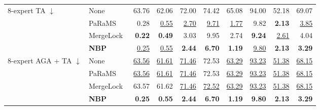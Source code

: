\begin{table}[!t]
\begin{tabular*}{\textwidth}{@{\extracolsep{\fill}}llrrrrrrrr@{}}
\midrule
\multirow{4}{*}{8-expert TA $\downarrow$} & None & 63.76 & 62.06 & 72.00 & 74.42 & 65.08 & 94.00 & 52.18 & 69.07 \\
 & PaRaMS~\cite{wei2025params} & 0.28 & \underline{0.55} & \underline{2.70} & \underline{9.71} & \underline{1.77} & 9.82 & \textbf{2.13} & \underline{3.85} \\
 & MergeLock~\cite{wang2025mergelock} & \textbf{0.22} & \textbf{0.49} & 3.03 & 9.95 & 2.74 & \textbf{9.24} & \underline{2.61} & 4.04 \\
 & \textbf{NBP} & \underline{0.25} & \underline{0.55} & \textbf{2.44} & \textbf{6.70} & \textbf{1.19} & \underline{9.80} & \textbf{2.13} & \textbf{3.29} \\
\midrule
\multirow{4}{*}{8-expert AGA + TA $\downarrow$} & None & \underline{63.56} & \underline{61.61} & \underline{71.46} & 72.53 & \underline{63.29} & \underline{93.23} & \underline{51.38} & \underline{68.15} \\
 & PaRaMS~\cite{wei2025params} & \underline{63.56} & \underline{61.61} & \underline{71.46} & 72.53 & \underline{63.29} & \underline{93.23} & \underline{51.38} & \underline{68.15} \\
 & MergeLock~\cite{wang2025mergelock} & 63.57 & 61.62 & \underline{71.46} & \underline{72.52} & \underline{63.29} & \underline{93.23} & \underline{51.38} & \underline{68.15} \\
 & \textbf{NBP} & \textbf{0.25} & \textbf{0.55} & \textbf{2.44} & \textbf{6.70} & \textbf{1.19} & \textbf{9.80} & \textbf{2.13} & \textbf{3.29} \\
\bottomrule
\end{tabular*}
\end{table}
